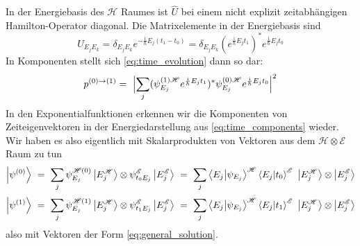 \documentclass[12pt]{article}
\begin{document}
In der Energiebasis des $\mathscr{H}$ Raumes ist $\hat{U}$ bei einem nicht explizit zeitabhängigen Hamilton-Operator diagonal. Die Matrixelemente in der Energiebasis sind 
\begin{equation} 
U_{E_j E_k} = \delta_{E_j E_k} e^{-\frac{\mathrm{i}}{\hbar}E_j(t_1-t_0)}
= 
\delta_{E_j E_k}(e^{\frac{\mathrm{i}}{\hbar}E_j t_1})^* e^{\frac{\mathrm{i}}{\hbar}E_j t_0}
\end{equation}
In Komponenten stellt sich \eqref{eq:time_evolution} dann so dar:
\begin{equation} 
p^{(0)\rightarrow(1)} =\ 
\Bigl| \sum_j
(\psi_{E_j}^{(1)\mathscr{H}} e^{\frac{\mathrm{i}}{\hbar}E_j t_1})^*
\psi_{E_j}^{(0)\mathscr{H}} e^{\frac{\mathrm{i}}{\hbar}E_j t_0}
\Bigr|^2
\end{equation}
In den Exponentialfunktionen erkennen wir die Komponenten von Zeiteigenvektoren in der Energiedarstellung aus \eqref{eq:time_components} wieder.
Wir haben es also eigentlich mit Skalarprodukten von Vektoren aus dem $\mathscr{H}\otimes\mathscr{E}$ Raum zu tun
\begin{equation*}
\ket{\psi^{(0)}}\ =\ \sum_j \psi_{E_j}^{\mathscr{H}(0)} \ket{E_j^\mathscr{H}} 
\otimes \psi_{t_0 E_j}^\mathscr{E} \ket{E_j^\mathscr{E}}
\ =\ \sum_j \bra{E_j}\ket{\psi_{E_j}}^{\mathscr{H}} \bra{E_j}\ket{t_0}^{\mathscr{E}} \ \ket{E_j^{\mathscr{H}}} \otimes \ket{E_j^{\mathscr{E}}} 
\end{equation*}
\begin{equation*}
\ket{\psi^{(1)}}\ =\ \sum_j \psi_{E_j}^{\mathscr{H}(1)} \ket{E_j^\mathscr{H}} 
\otimes \psi_{t_1 E_j}^\mathscr{E} \ket{E_j^\mathscr{E}}
\ =\ \sum_j \bra{E_j}\ket{\psi_{E_j}}^{\mathscr{H}} \bra{E_j}\ket{t_1}^{\mathscr{E}} \ \ket{E_j^{\mathscr{H}}} \otimes \ket{E_j^{\mathscr{E}}} 
\end{equation*}
also mit Vektoren der Form \eqref{eq:general_solution}.



\end{document}
